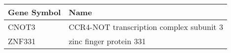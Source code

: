 \begin{tabular}{ll}
\toprule
Gene Symbol &                                     Name \\
\midrule
      CNOT3 & CCR4-NOT transcription complex subunit 3 \\
     ZNF331 &                  zinc finger protein 331 \\
\bottomrule
\end{tabular}
